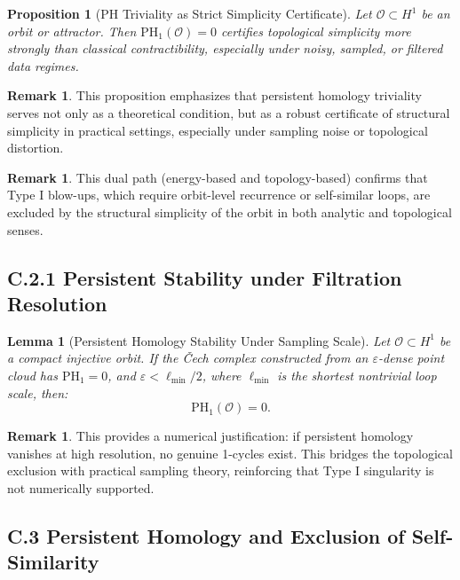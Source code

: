 \documentclass[11pt]{article}
\newtheorem{lemma}[theorem]{Lemma}
\newtheorem{proposition}[theorem]{Proposition}
\theoremstyle{definition}
\newtheorem{remark}[theorem]{Remark}
\begin{document}
\begin{proposition}[PH Triviality as Strict Simplicity Certificate]
Let \( \mathcal{O} \subset H^1 \) be an orbit or attractor. Then $\mathrm{PH}_1(\mathcal{O}) = 0$ certifies topological simplicity more strongly than classical contractibility, especially under noisy, sampled, or filtered data regimes.
\end{proposition}

\begin{remark}
This proposition emphasizes that persistent homology triviality serves not only as a theoretical condition, but as a robust certificate of structural simplicity in practical settings, especially under sampling noise or topological distortion.
\end{remark}

\begin{remark}
This dual path (energy-based and topology-based) confirms that Type I blow-ups, which require orbit-level recurrence or self-similar loops, are excluded by the structural simplicity of the orbit in both analytic and topological senses.
\end{remark}

\subsection*{C.2.1 Persistent Stability under Filtration Resolution}

\begin{lemma}[Persistent Homology Stability Under Sampling Scale]
Let \( \mathcal{O} \subset H^1 \) be a compact injective orbit. If the Čech complex constructed from an \( \varepsilon \)-dense point cloud has \( \mathrm{PH}_1 = 0 \), and \( \varepsilon < \ell_{\min}/2 \), where \( \ell_{\min} \) is the shortest nontrivial loop scale, then:
\[
\mathrm{PH}_1(\mathcal{O}) = 0.
\]
\end{lemma}

\begin{remark}
This provides a numerical justification: if persistent homology vanishes at high resolution, no genuine 1-cycles exist. This bridges the topological exclusion with practical sampling theory, reinforcing that Type I singularity is not numerically supported.
\end{remark}

\subsection*{C.3 Persistent Homology and Exclusion of Self-Similarity}
\end{document}
